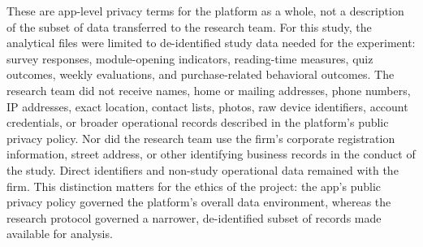 \documentclass[12pt,american]{article}
\begin{document}
\begin{refsection}
		These are app-level privacy terms for the platform as a whole, not a description of the subset of data transferred to the research team. For this study, the analytical files were limited to de-identified study data needed for the experiment: survey responses, module-opening indicators, reading-time measures, quiz outcomes, weekly evaluations, and purchase-related behavioral outcomes. The research team did not receive names, home or mailing addresses, phone numbers, IP addresses, exact location, contact lists, photos, raw device identifiers, account credentials, or broader operational records described in the platform's public privacy policy. Nor did the research team use the firm's corporate registration information, street address, or other identifying business records in the conduct of the study. Direct identifiers and non-study operational data remained with the firm. This distinction matters for the ethics of the project: the app's public privacy policy governed the platform's overall data environment, whereas the research protocol governed a narrower, de-identified subset of records made available for analysis.
		
	\end{refsection}
	
\end{document}
